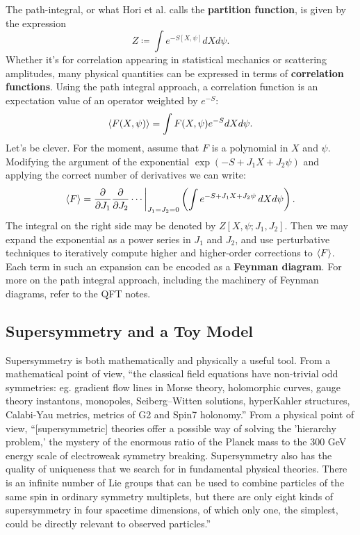 \documentclass{report}
\theoremstyle{plain}
\theoremstyle{definition}
\theoremstyle{remark}
\newcommand{\di}{\partial}
\newcommand{\FR}[2]{\frac{#1}{#2}}
\begin{document}
The path-integral, or what Hori et al. calls the \textbf{partition
function}, is given by the expression \[Z \coloneqq \int e^{-S[X,\psi]}dX
d\psi.\] Whether it's for correlation appearing in statistical mechanics or
scattering amplitudes, many physical quantities can be expressed in terms
of \textbf{correlation functions}. Using the path integral approach, a
correlation function is an expectation value of an operator weighted by
$e^{-S}$: \[\braket{F(X,\psi)} = \int F(X,\psi) e^{-S}  dXd\psi.\] Let's be
clever. For the moment, assume that $F$ is a polynomial in $X$ and $\psi$.
Modifying the argument of the exponential $\exp(-S + J_1X+J_2\psi)$ and
applying the correct number of derivatives we can write:
\[ \braket{F} = \FR{\di}{\di J_1}\FR{\di}{\di J_2}\cdots
\biggr|_{J_1=J_2=0} \left(\int e^{-S+J_1X+J_2\psi}\, dXd\psi\right). \]
The integral on the right side may be denoted by $Z[X,\psi;J_1,J_2]$.
Then we may expand the exponential as a power series in $J_1$ and
$J_2$, and use perturbative techniques to iteratively compute higher
and higher-order corrections to $\braket{F}$. Each term in such an
expansion can be encoded as a {\bf Feynman diagram}. For more on the
path integral approach, including the machinery of Feynman diagrams,
refer to the QFT notes.

\subsection{Supersymmetry and a Toy Model}

Supersymmetry is both mathematically and physically a useful tool.
From a mathematical point of view, ``the classical field equations
have non-trivial odd symmetries: eg. gradient flow lines in Morse
theory, holomorphic curves, gauge theory instantons, monopoles,
Seiberg--Witten solutions, hyperKahler structures, Calabi-Yau metrics,
metrics of G2 and Spin7 holonomy.'' From a physical point of view,
``[supersymmetric] theories offer a possible way of solving the
'hierarchy problem,' the mystery of the enormous ratio of the Planck
mass to the 300 GeV energy scale of electroweak symmetry breaking.
Supersymmetry also has the quality of uniqueness that we search for in
fundamental physical theories. There is an infinite number of Lie
groups that can be used to combine particles of the same spin in
ordinary symmetry multiplets, but there are only eight kinds of
supersymmetry in four spacetime dimensions, of which only one, the
simplest, could be directly relevant to observed particles.''
\end{document}
